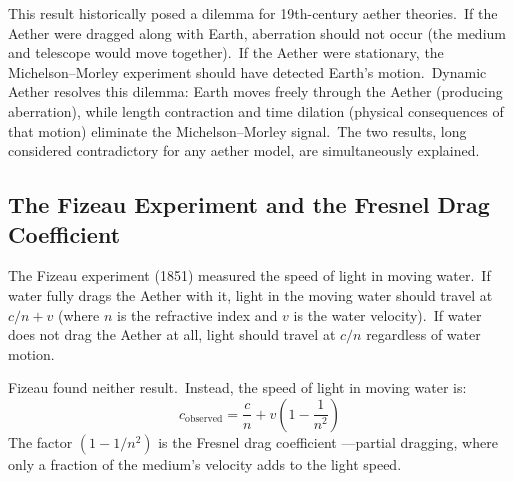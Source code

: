 ﻿\documentclass[12pt,letterpaper]{article}
\begin{document}
This result historically posed a dilemma for 19th-century aether theories.\ If the Aether
were dragged along with Earth, aberration should not occur (the medium and telescope would
move together).\ If the Aether were stationary, the Michelson--Morley experiment should
have detected Earth's motion.\ Dynamic Aether resolves this dilemma: Earth moves freely
through the Aether (producing aberration), while length contraction and time dilation
(physical consequences of that motion) eliminate the Michelson--Morley signal.\ The two
results, long considered contradictory for any aether model, are simultaneously explained.


\subsection{The Fizeau Experiment and the Fresnel Drag Coefficient}

The Fizeau experiment \cite{fizeau1851} (1851) measured the speed of light in moving water.\ If water fully
drags the Aether with it, light in the moving water should travel at $c/n + v$ (where $n$ is
the refractive index and $v$ is the water velocity).\ If water does not drag the Aether at
all, light should travel at $c/n$ regardless of water motion.

Fizeau found neither result.\ Instead, the speed of light in moving water is:
%
\begin{equation}
  c_{\mathrm{observed}} = \frac{c}{n} + v\!\left(1 - \frac{1}{n^2}\right)
\end{equation}
%
The factor $(1 - 1/n^2)$ is the Fresnel drag coefficient \cite{fresnel1818}---partial dragging, where only a
fraction of the medium's velocity adds to the light speed.
\end{document}
